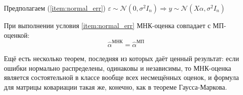 \documentclass[main.tex]{subfiles}
\begin{document}
Предполагаем (\ref{item:normal_err}) $ \varepsilon \sim \mathcal{N}(0, \sigma^2 I_n) \Rightarrow y \sim \mathcal{N}(X\alpha, \sigma^2 I_n) $

\begin{theorem}
    При выполнении условия \ref{item:normal_err} МНК-оценка совпадает с МП-оценкой:
    $$ \hat \alpha^{\text{МНК}} = \hat \alpha^{\text{МП}} $$
\end{theorem}

Ещё есть несколько теорем, последняя из которых даёт ценный результат: если ошибки нормально распределены, одинаковы и независимы, то МНК-оценка является состоятельной в классе вообще всех несмещённых оценок, и формула для матрицы ковариации такая же, конечно, как в теореме Гаусса-Маркова.
\end{document}
